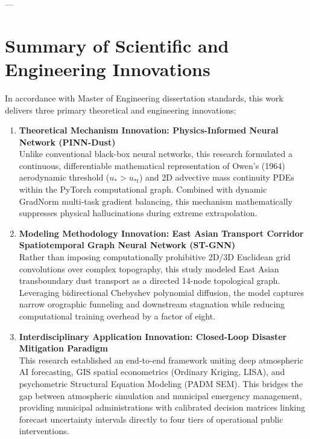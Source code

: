 ---

\section{Summary of Scientific and Engineering Innovations}
\label{sec:innovations_summary}

In accordance with Master of Engineering dissertation standards, this work delivers three primary theoretical and engineering innovations:

\begin{enumerate}
    \item \textbf{Theoretical Mechanism Innovation: Physics-Informed Neural Network (PINN-Dust)} \\
    Unlike conventional black-box neural networks, this research formulated a continuous, differentiable mathematical representation of Owen's (1964) aerodynamic threshold ($u_* > u_{*t}$) and 2D advective mass continuity PDEs within the PyTorch computational graph. Combined with dynamic GradNorm multi-task gradient balancing, this mechanism mathematically suppresses physical hallucinations during extreme extrapolation.

    \item \textbf{Modeling Methodology Innovation: East Asian Transport Corridor Spatiotemporal Graph Neural Network (ST-GNN)} \\
    Rather than imposing computationally prohibitive 2D/3D Euclidean grid convolutions over complex topography, this study modeled East Asian transboundary dust transport as a directed 14-node topological graph. Leveraging bidirectional Chebyshev polynomial diffusion, the model captures narrow orographic funneling and downstream stagnation while reducing computational training overhead by a factor of eight.

    \item \textbf{Interdisciplinary Application Innovation: Closed-Loop Disaster Mitigation Paradigm} \\
    This research established an end-to-end framework uniting deep atmospheric AI forecasting, GIS spatial econometrics (Ordinary Kriging, LISA), and psychometric Structural Equation Modeling (PADM SEM). This bridges the gap between atmospheric simulation and municipal emergency management, providing municipal administrations with calibrated decision matrices linking forecast uncertainty intervals directly to four tiers of operational public interventions.
\end{enumerate}

